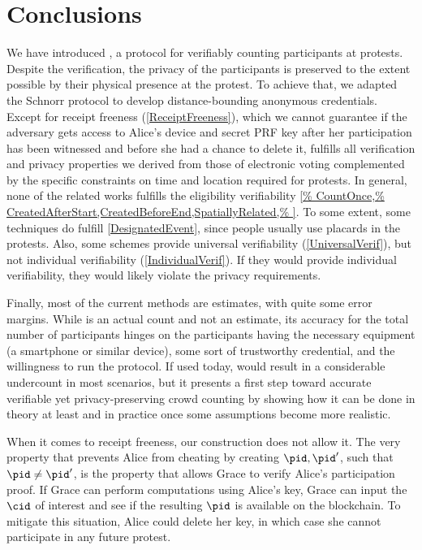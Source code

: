 \section{Conclusions}%
\label{Conclusions}

We have introduced \PRIVO, a protocol for verifiably counting
participants at protests. Despite the verification, the privacy of the
participants is preserved to the extent possible by their physical
presence at the protest. To achieve that, we adapted the Schnorr
protocol to develop distance-bounding anonymous credentials. Except for receipt
freeness (\cref{ReceiptFreeness}), which we cannot guarantee if the adversary gets access to
Alice's device and secret PRF key after her participation has
been witnessed and before she had a chance to
delete it, \PRIVO
fulfills all verification and privacy properties we derived from those
of electronic voting complemented by the specific constraints on time
and location required for protests. 
In general, none of the related works fulfills the eligibility verifiability 
\cref{%
  CountOnce,%
  CreatedAfterStart,CreatedBeforeEnd,SpatiallyRelated,%
}.
To some extent, some techniques do fulfill \cref{DesignatedEvent}, since people 
usually use placards in the protests.
Also, some schemes provide universal verifiability (\cref{UniversalVerif}), but 
not individual verifiability (\cref{IndividualVerif}).
If they would provide individual verifiability, they would likely violate the 
privacy requirements.

Finally, most of the current methods are estimates, with quite some error 
margins. While \PRIVO is an actual count and not an estimate, its
accuracy for the total number of participants hinges on the
participants having the necessary equipment (a smartphone or similar
device), some sort of trustworthy credential, and the willingness to
run the protocol. If used today, \PRIVO would result in a
considerable undercount in most scenarios, but it presents a first
step toward accurate verifiable yet privacy-preserving crowd counting
by showing how it can be done in theory at least and in practice once
some assumptions become more realistic. 

When it comes to receipt freeness, our construction does not allow it.
The very property that prevents Alice from cheating by creating \(\pid, \pid'\), 
such that \(\pid \neq \pid'\), is the property that allows Grace to verify 
Alice's participation proof.
If Grace can perform computations using Alice's key, Grace can input the 
\(\cid\) of interest and see if the resulting \(\pid\) is available on the 
blockchain.
To mitigate this situation, Alice could delete her key, in which case she cannot 
participate in any future protest.

